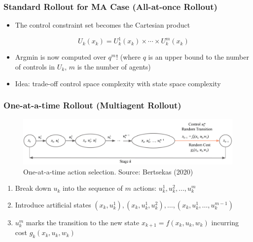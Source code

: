 \documentclass{beamer}
\begin{document}


\begin{frame}
	\frametitle{Standard Rollout for MA Case (All-at-once Rollout)}
	
	\begin{itemize}
		\item The control constraint set becomes 
		the Cartesian product

$$
U_{k}\left(x_{k}\right)=U_{k}^{1}\left(x_{k}\right) \times \cdots \times U_{k}^{m}\left(x_{k}\right)
$$

		\item Argmin is now computed over $q^m$! (where $q$ is an upper bound to the number of
		controls in $U_{k}$, $m$ is the number of agents)

		\item Idea: trade-off control space complexity 
		with state space complexity

	\end{itemize}
	
\end{frame}






\begin{frame}
	\frametitle{One-at-a-time Rollout (Multiagent Rollout)}
	
    \begin{figure}
	\includegraphics[scale=0.4]{2b}
	\caption{One-at-a-time action selection. Source: Bertsekas (2020)}
	\end{figure}	
	
		
	\begin{enumerate}
		\item Break down $u_k$ into the sequence of $m$ actions: 
		$u^1_k, u^2_k, ..., u^m_k$
		
		\item Introduce artificial states $\left(x_{k}, u_{k}^{1}\right),\left(x_{k}, u_{k}^{1}, u_{k}^{2}\right), \ldots,\left(x_{k}, u_{k}^{1}, \ldots, u_{k}^{m-1}\right)$
		\item $u^m_k$ marks the transition to the new state 
		$x_{k+1}=f(x_k, u_k, w_k)$ incurring cost $g_k(x_k, u_k, w_k)$
	\end{enumerate}


	
\end{frame}
\end{document}
